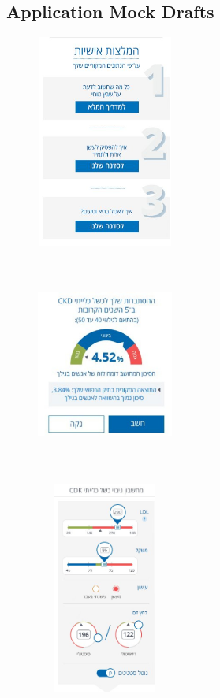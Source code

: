 \documentclass[a4paper,12pt]{article}
\begin{document}
\begin{appendices}
   			\subsection{Application Mock Drafts}
   			\begin{figure}[H]
   				\begin{minipage}{.3\linewidth}
   					\includegraphics[width=4.5cm, height=7cm]{prelim-results/calc3}
   					\label{calc3}
   				\end{minipage}
   				\hspace{.01\linewidth}
   				\begin{minipage}{.3\linewidth}
   					\includegraphics[width=4.5cm, height=7cm]{prelim-results/calc2b}
   					\label{calc2}
   				\end{minipage}
   				\hspace{.01\linewidth}
   				\begin{minipage}{.3\linewidth}
   					\includegraphics[width=4.5cm, height=7cm]{prelim-results/calc1}
   					\label{calc1}
   				\end{minipage}
   			\end{figure}
   		
   	\end{appendices}
	
\end{document}
